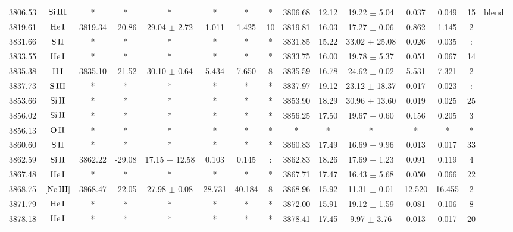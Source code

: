 \documentclass{article}
\begin{document}
\begin{table*}
\begin{adjustbox}{width=\textwidth}
\begin{tabular}{ccccccccccccccc}
3806.53 & $\mbox{Si}\thinspace \mbox{III}$ & * & * & * & * & * & * & 3806.68 & 12.12 & 19.22 $\pm$ 5.04 & 0.037 & 0.049 & 15 &  blend \\
3819.61 & $\mbox{He}\thinspace \mbox{I}$ & 3819.34 & -20.86 & 29.04 $\pm$ 2.72 & 1.011 & 1.425 & 10 & 3819.81 & 16.03 & 17.27 $\pm$ 0.06 & 0.862 & 1.145 & 2 &  \\
3831.66 & $\mbox{S}\thinspace \mbox{II}$ & * & * & * & * & * & * & 3831.85 & 15.22 & 33.02 $\pm$ 25.08 & 0.026 & 0.035 & : &  \\
3833.55 & $\mbox{He}\thinspace \mbox{I}$ & * & * & * & * & * & * & 3833.75 & 16.00 & 19.78 $\pm$ 5.37 & 0.051 & 0.067 & 14 &  \\
3835.38 & $\mbox{H}\thinspace \mbox{I}$ & 3835.10 & -21.52 & 30.10 $\pm$ 0.64 & 5.434 & 7.650 & 8 & 3835.59 & 16.78 & 24.62 $\pm$ 0.02 & 5.531 & 7.321 & 2 &  \\
3837.73 & $\mbox{S}\thinspace \mbox{III}$ & * & * & * & * & * & * & 3837.97 & 19.12 & 23.12 $\pm$ 18.37 & 0.017 & 0.023 & : &  \\
3853.66 & $\mbox{Si}\thinspace \mbox{II}$ & * & * & * & * & * & * & 3853.90 & 18.29 & 30.96 $\pm$ 13.60 & 0.019 & 0.025 & 25 &  \\
3856.02 & $\mbox{Si}\thinspace \mbox{II}$ & * & * & * & * & * & * & 3856.25 & 17.50 & 19.67 $\pm$ 0.60 & 0.156 & 0.205 & 3 &  \\
3856.13 & $\mbox{O}\thinspace \mbox{II}$ & * & * & * & * & * & * & * & * & * & * & * & * &  \\
3860.60 & $\mbox{S}\thinspace \mbox{II}$ & * & * & * & * & * & * & 3860.83 & 17.49 & 16.69 $\pm$ 9.96 & 0.013 & 0.017 & 33 &  \\
3862.59 & $\mbox{Si}\thinspace \mbox{II}$ & 3862.22 & -29.08 & 17.15 $\pm$ 12.58 & 0.103 & 0.145 & : & 3862.83 & 18.26 & 17.69 $\pm$ 1.23 & 0.091 & 0.119 & 4 &  \\
3867.48 & $\mbox{He}\thinspace \mbox{I}$ & * & * & * & * & * & * & 3867.71 & 17.47 & 16.43 $\pm$ 5.68 & 0.050 & 0.066 & 22 &  \\
3868.75 & $\mbox{[Ne}\thinspace \mbox{III]}$ & 3868.47 & -22.05 & 27.98 $\pm$ 0.08 & 28.731 & 40.184 & 8 & 3868.96 & 15.92 & 11.31 $\pm$ 0.01 & 12.520 & 16.455 & 2 &  \\
3871.79 & $\mbox{He}\thinspace \mbox{I}$ & * & * & * & * & * & * & 3872.00 & 15.91 & 19.12 $\pm$ 1.59 & 0.081 & 0.106 & 8 &  \\
3878.18 & $\mbox{He}\thinspace \mbox{I}$ & * & * & * & * & * & * & 3878.41 & 17.45 & 9.97 $\pm$ 3.76 & 0.013 & 0.017 & 20 &  \\

\end{tabular}
\end{adjustbox}
\end{table*}
\end{document}
